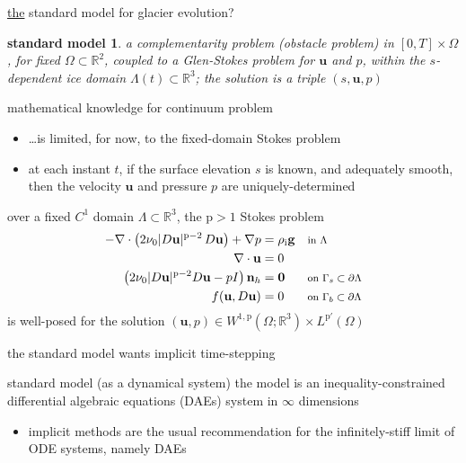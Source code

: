 \documentclass[10pt,svgnames]{beamer}
\newcommand{\bg}{\mathbf{g}}
\newcommand{\bn}{\mathbf{n}}
\newcommand{\bu}{\mathbf{u}}
\newcommand{\bzero}{\bm{0}}
\newcommand{\RR}{\mathbb{R}}
\newcommand{\pp}{\mathrm{p}}
\newcommand{\rhoi}{\rho_{\text{i}}}
\newcommand{\where}[1]{\text{\footnotesize #1}}
\newcommand{\aler}[1]{{\color{FireBrick} #1}}
\begin{document}
\begin{frame}{\underline{the} standard model for glacier evolution?}

\stdblock

\bigskip
\newtheorem*{smodel}{standard model}

\begin{smodel}
a complementarity problem (obstacle problem) in $[0,T]\times \Omega$, for fixed $\Omega \subset \RR^2$, \aler{coupled} to a Glen-Stokes problem for $\bu$ and $p$, within the $s$-dependent ice domain $\Lambda(t) \subset \RR^3$; the solution is a triple $(s,\bu,p)$
\end{smodel}
\end{frame}


\begin{frame}{mathematical knowledge for continuum problem}

\begin{itemize}
\item \dots is limited, for now, to the \aler{fixed-domain Stokes problem}
\item at each instant $t$, if the surface elevation $s$ is known, and adequately smooth, then the velocity $\bu$ and pressure $p$ are uniquely-determined
\end{itemize}

\begin{theorem}
over a fixed $C^1$ domain $\Lambda\subset\RR^3$, the $\pp>1$ Stokes problem
\begin{align*}
- \nabla \cdot \left(2 \nu_0 |D\bu|^{\pp-2}\, D\bu\right) + \nabla p &= \rhoi \bg && \where{in $\Lambda$} \\
\nabla \cdot \bu &= 0 \\
\left(2 \nu_0 |D\bu|^{\pp-2} D\bu - pI\right) \bn_h &= \bzero && \where{on $\Gamma_s\subset\partial\Lambda$} \\
f(\bu,D\bu) &= 0 && \where{on $\Gamma_b\subset\partial\Lambda$}
\end{align*}
is well-posed for the solution $(\bu,p) \in W^{1,\pp}(\Omega;\RR^3) \times L^{\pp'}(\Omega)$
\end{theorem}
\end{frame}


\begin{frame}{the standard model wants implicit time-stepping}

{\footnotesize
\stdblock
}

\begin{block}{standard model (as a dynamical system)}
the model is an inequality-constrained \aler{differential algebraic equations} (DAEs) system in $\infty$ dimensions
\end{block}

\begin{itemize}
\item<2> \aler{implicit} methods are the usual recommendation for the infinitely-stiff limit of ODE systems, namely DAEs
\end{itemize}
\end{frame}
\end{document}
